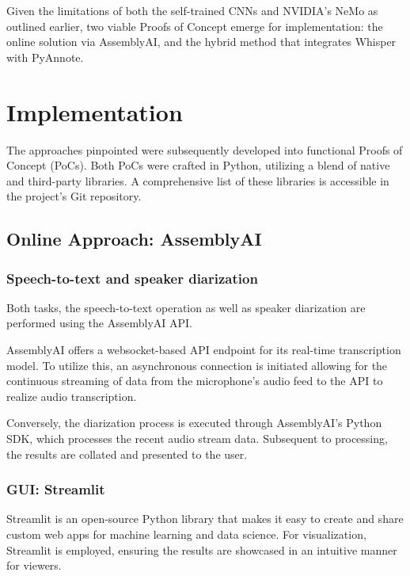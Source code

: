 \documentclass[12pt]{article}
\begin{document}
\noindent Given the limitations of both the self-trained CNNs and NVIDIA's NeMo as outlined earlier, two viable Proofs of Concept emerge for implementation: the online solution via AssemblyAI, and the hybrid method that integrates Whisper with PyAnnote.

\section{Implementation}
\label{sec:implementation}

The approaches pinpointed were subsequently developed into functional Proofs of Concept (PoCs). Both PoCs were crafted in Python, utilizing a blend of native and third-party libraries. A comprehensive list of these libraries is accessible in the project's Git repository.

\subsection{Online Approach: AssemblyAI}
\label{ssec:online}

\subsubsection{Speech-to-text and speaker diarization}

Both tasks, the speech-to-text operation as well as speaker diarization are performed using the AssemblyAI API.

AssemblyAI offers a websocket-based API endpoint for its real-time transcription model. To utilize this, an asynchronous connection is initiated allowing for the continuous streaming of data from the microphone's audio feed to the API to realize audio transcription.

Conversely, the diarization process is executed through AssemblyAI's Python SDK, which processes the recent audio stream data. Subsequent to processing, the results are collated and presented to the user.

\subsubsection{GUI: Streamlit}

Streamlit is an open-source Python library that makes it easy to create and share custom web apps for machine learning and data science. For visualization, Streamlit is employed, ensuring the results are showcased in an intuitive manner for viewers.  
\end{document}
